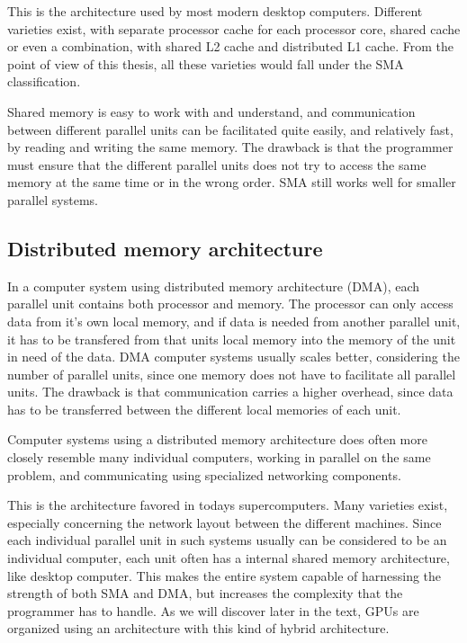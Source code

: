 This is the architecture used by most modern desktop computers. Different varieties exist, with separate processor cache for each processor core, shared cache or even a combination, with shared L2 cache and distributed L1 cache. From the point of view of this thesis, all these varieties would fall under the SMA classification.

Shared memory is easy to work with and understand, and communication between different parallel units can be facilitated quite easily, and relatively fast, by reading and writing the same memory. The drawback is that the programmer must ensure that the different parallel units does not try to access the same memory at the same time or in the wrong order. SMA still works well for smaller parallel systems.

\subsection{Distributed memory architecture} %
\label{sub:distributed_memory_architecture}

In a computer system using distributed memory architecture (DMA), each parallel unit contains both processor and memory. The processor can only access data from it's own local memory, and if data is needed from another parallel unit, it has to be transfered from that units local memory into the memory of the unit in need of the data. DMA computer systems usually scales better, considering the number of parallel units, since one memory does not have to facilitate all parallel units. The drawback is that communication carries a higher overhead, since data has to be transferred between the different local memories of each unit.

Computer systems using a distributed memory architecture does often more closely resemble many individual computers, working in parallel on the same problem, and communicating using specialized networking components.

This is the architecture favored in todays supercomputers. Many varieties exist, especially concerning the network layout between the different machines. Since each individual parallel unit in such systems usually can be considered to be an individual computer, each unit often has a internal shared memory architecture, like desktop computer. This makes the entire system capable of harnessing the strength of both SMA and DMA, but increases the complexity that the programmer has to handle. As we will discover later in the text, GPUs are organized using an architecture with this kind of hybrid architecture.

